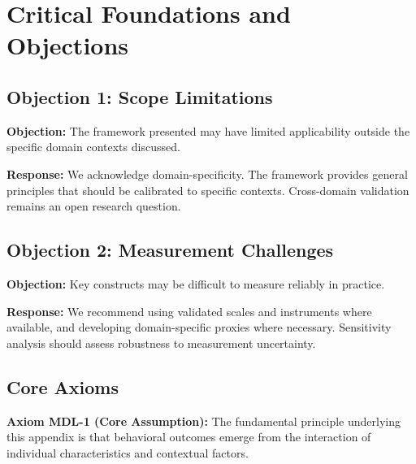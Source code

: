 
\section{Critical Foundations and Objections}
\label{sec:mdl-foundations}

\subsection{Objection 1: Scope Limitations}

\textbf{Objection:} The framework presented may have limited applicability
outside the specific domain contexts discussed.

\textbf{Response:} We acknowledge domain-specificity. The framework provides
general principles that should be calibrated to specific contexts. Cross-domain
validation remains an open research question.

\subsection{Objection 2: Measurement Challenges}

\textbf{Objection:} Key constructs may be difficult to measure reliably in
practice.

\textbf{Response:} We recommend using validated scales and instruments where
available, and developing domain-specific proxies where necessary. Sensitivity
analysis should assess robustness to measurement uncertainty.



\subsection{Core Axioms}
\label{sec:mdl-axioms}

\begin{tcolorbox}[colback=yellow!5!white,colframe=yellow!75!black,title=Axiom MDL-1: Fundamental Principle]
\textbf{Axiom MDL-1 (Core Assumption):}
The fundamental principle underlying this appendix is that behavioral outcomes
emerge from the interaction of individual characteristics and contextual factors.
\end{tcolorbox}

